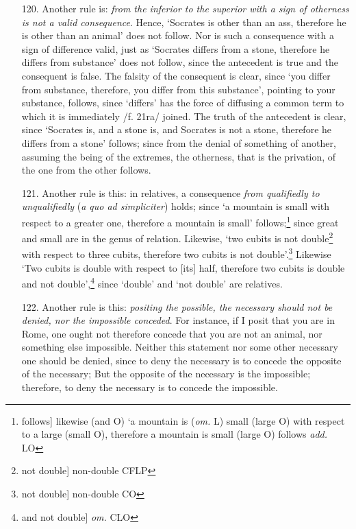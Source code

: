 \begin{itemize}
\item[120.] Another rule is: \textit{from the inferior to the superior with a sign of otherness is not a valid consequence}. Hence, `Socrates is other than an ass, therefore he is other than an animal' does not follow. Nor is such a consequence with a sign of difference valid, just as `Socrates differs from a stone, therefore he differs from substance' does not follow, since the antecedent is true and the consequent is false. The falsity of the consequent is clear, since `you differ from substance, therefore, you differ from this substance', pointing to your substance, follows, since `differs' has the force of diffusing a common term to which it is immediately /f. 21ra/ joined. The truth of the antecedent is clear, since `Socrates is, and a stone is, and Socrates is not a stone, therefore he differs from a stone' follows; since from the denial of something of another, assuming the being of the extremes, the otherness, that is the privation, of the one from the other follows.
\item[121.] Another rule is this: in relatives, a consequence \textit{from qualifiedly to unqualifiedly} (\textit{a quo ad simpliciter}) holds; since `a mountain is small with respect to a greater one, therefore a mountain is small' follows;\footnote{follows] likewise (and O) `a mountain is (\textit{om.} L) small (large O) with respect to a large (small O), therefore a mountain is small (large O) follows \textit{add.} LO} since great and small are in the genus of relation. Likewise, `two cubits is not double\footnote{not double] non-double CFLP} with respect to three cubits, therefore two cubits is not double'.\footnote{not double] non-double CO} Likewise `Two cubits is double with respect to [its] half, therefore two cubits is double and not double',\footnote{and not double] \textit{om.} CLO} since `double' and `not double' are relatives.
\item[122.] Another rule is this: \textit{positing the possible, the necessary should not be denied, nor the impossible conceded}. For instance, if I posit that you are in Rome, one ought not therefore concede that you are not an animal, nor something else impossible. Neither this statement nor some other necessary one should be denied, since to deny the necessary is to concede the opposite of the necessary; But the opposite of the necessary is the impossible; therefore, to deny the necessary is to concede the impossible.

\end{itemize}
